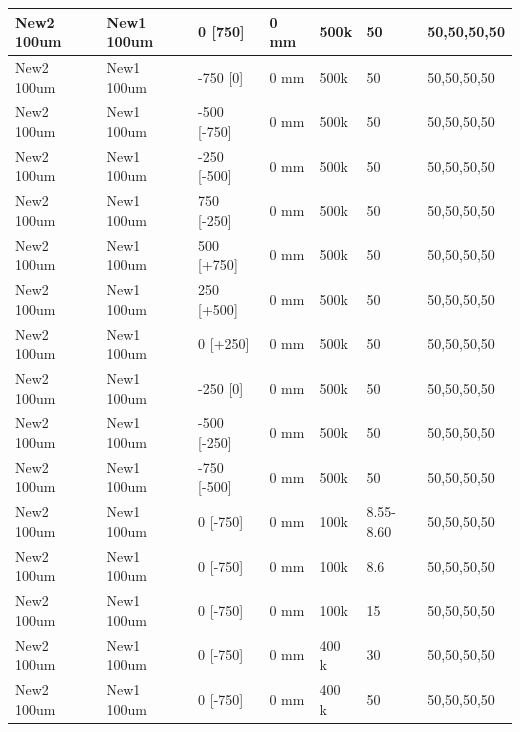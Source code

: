 \begin{refsection}
\begin{table}
\begin{tabular}{|l|l|l|l|l|l|l|}
            New2 100um  & New1 100um  & 0 {[}750{]}      & 0 mm     & 500k   & 50            & 50,50,50,50       \\ \hline
            New2 100um  & New1 100um  & -750 {[}0{]}     & 0 mm     & 500k   & 50            & 50,50,50,50       \\ \hline
            New2 100um  & New1 100um  & -500 {[}-750{]}  & 0 mm     & 500k   & 50            & 50,50,50,50       \\ \hline
            New2 100um  & New1 100um  & -250 {[}-500{]}  & 0 mm     & 500k   & 50            & 50,50,50,50       \\ \hline
            New2 100um  & New1 100um  & 750 {[}-250{]}   & 0 mm     & 500k   & 50            & 50,50,50,50       \\ \hline
            New2 100um  & New1 100um  & 500 {[}+750{]}   & 0 mm     & 500k   & 50            & 50,50,50,50       \\ \hline
            New2 100um  & New1 100um  & 250 {[}+500{]}   & 0 mm     & 500k   & 50            & 50,50,50,50       \\ \hline
            New2 100um  & New1 100um  & 0 {[}+250{]}     & 0 mm     & 500k   & 50            & 50,50,50,50       \\ \hline
            New2 100um  & New1 100um  & -250 {[}0{]}     & 0 mm     & 500k   & 50            & 50,50,50,50       \\ \hline
            New2 100um  & New1 100um  & -500 {[}-250{]}  & 0 mm     & 500k   & 50            & 50,50,50,50       \\ \hline
            New2 100um  & New1 100um  & -750 {[}-500{]}  & 0 mm     & 500k   & 50            & 50,50,50,50       \\ \hline
            New2 100um  & New1 100um  & 0 {[}-750{]}     & 0 mm     & 100k   & 8.55-8.60     & 50,50,50,50       \\ \hline
            New2 100um  & New1 100um  & 0 {[}-750{]}     & 0 mm     & 100k   & 8.6           & 50,50,50,50       \\ \hline
            New2 100um  & New1 100um  & 0 {[}-750{]}     & 0 mm     & 100k   & 15            & 50,50,50,50       \\ \hline
            New2 100um  & New1 100um  & 0 {[}-750{]}     & 0 mm     & 400 k  & 30            & 50,50,50,50       \\ \hline
            New2 100um  & New1 100um  & 0 {[}-750{]}     & 0 mm     & 400 k  & 50            & 50,50,50,50       \\ \hline

\end{tabular}
\end{table}
\end{refsection}

